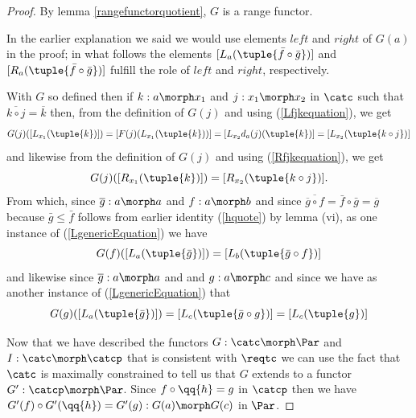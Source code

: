 \begin{proof}
By lemma \ref{rangefunctorquotient}, $G$ is a range functor.

In the earlier explanation we said we would use elements $left$ and $right$ of $G(a)$
in the proof; in what follows
the elements
$[L_a(\tuple{\bar{f}\circ \bar{g}})]$ and $[R_a(\tuple{\bar{f}\circ \bar{g}})]$ fulfill the role of $left$ and $right$, respectively.

With $G$ so defined then if $k: a \morph x_1$ and $j:x_1 \morph x_2$ in $\catc$ such that $\overline{k \circ j}=\overline{k}$
then, from the definition of $G(j)$ and using  (\ref{Lfjkequation}), we get
\begin{equation}
\label{LgenericEquation}
G(j)([L_{x_1}(\tuple{k})])
=[F(j)(L_{x_1}(\tuple{k}))] 
= [L_{x_2}d_a(j)(\tuple{k})]  
=[L_{x_2}(\tuple{k \circ j})]
\end{equation}
 and likewise from the definition of $G(j)$ and using  (\ref{Rfjkequation}), we get
\begin{equation} 
G(j)([R_{x_1}(\tuple{k})])=[R_{x_2}(\tuple{k \circ j})].
\end{equation} 
From which, since $\overline{g}: a \morph a$ and $f:a \morph b$  
and since $\overline{\overline{g}\circ f} = \bar{f} \circ \bar{g} = \overline{g}$
because $\bar{g} \leq \bar{f}$ follows 
from earlier identity (\ref{hquote}) by lemma (vi),
as one instance of (\ref{LgenericEquation}) we have 
\begin{equation}
\label{Lfequation}
G(f)([L_a(\tuple{\bar{g}})])=[L_{b}(\tuple{\bar{g} \circ f})]
\end{equation}
and likewise since $\overline{g}: a \morph a$ and  and $g:a \morph c$  
and since 
 we have as another instance of (\ref{LgenericEquation}) that
\begin{equation}
\label{Lgequation}
G(g)([L_a(\tuple{\bar{g}})])=[L_{c}(\tuple{\bar{g} \circ g})]=[L_{c}(\tuple{g})]
\end{equation}

Now that we have described the functors  $G: \catc \morph \Par$ and $I:\catc \morph \catcp$ that is consistent with $\reqtc$
we can use the fact that $\catc$ is maximally constrained to tell us that $G$ extends to a functor 
$G' : \catcp \morph \Par$. Since $f \circ \qq{h} = g$ in $\catcp$ then we have
 $G'(f) \circ G'(\qq{h}) = G'(g): G(a) \morph G(c)$ in $\Par$.


\end{proof}
